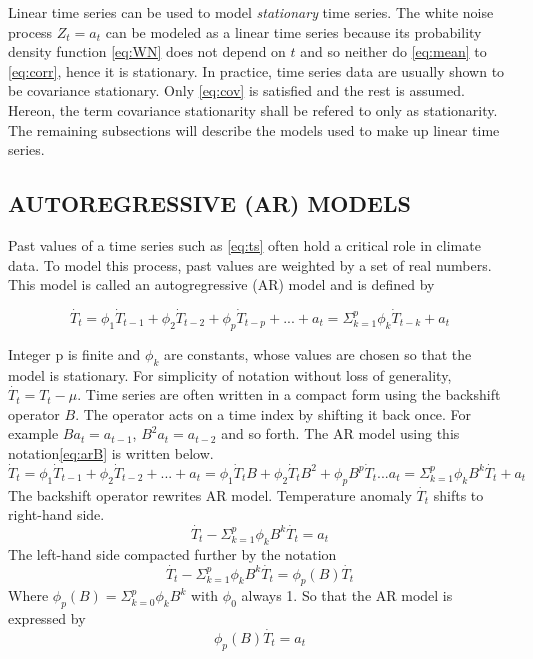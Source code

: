 Linear time series can be used to model \textit{stationary} time series. The white noise process $Z_t = a_t$ can be modeled as a linear time series because its probability density function \ref{eq:WN} does not depend on $t$ and so neither do \ref{eq:mean} to \ref{eq:corr}, hence it is stationary. In practice, time series data are usually shown to be covariance stationary. Only \ref{eq:cov} is satisfied and the rest is assumed. Hereon, the term covariance stationarity shall be refered to only as stationarity.
The remaining subsections will describe the models used to make up linear time series.

\subsection{AUTOREGRESSIVE (AR) MODELS}

Past values of a time series such as \ref{eq:ts} often hold a critical role in climate data. To model this process, past values are weighted by a set of real numbers. This model is called an autogregressive (AR) model and is defined by

\begin{equation}\label{eq:ar}
\dot{T_t} = \phi_1 \dot{T}_{t-1} + \phi_2 \dot{T}_{t-2} + \phi_p \dot{T}_{t-p} + ... + a_t = \Sigma_{k=1}^p \phi_k \dot{T}_{t-k} + a_t
\end{equation}

Integer p is finite and $\phi_k$ are constants, whose values are chosen so that the model is stationary. For simplicity of notation without loss of generality, $\dot{T_t}=T_t - \mu$. Time series are often written in a compact form using the backshift operator $B$. The operator acts on a time index by shifting it back once. For example $Ba_t = a_{t-1}$, $B^2a_t = a_{t-2}$ and so forth. The AR model using this notation\ref{eq:arB} is written below.
\begin{equation}\label{eq:arB}
\dot{T}_{t} = \phi_1 \dot{T}_{t-1} + \phi_2 \dot{T}_{t-2} + ... + a_t = \phi_1 \dot{T}_{t} B + \phi_2 \dot{T}_{t} B^2 + \phi_p B^p \dot{T}_{t}... a_t = \Sigma_{k=1}^p \phi_k B^k \dot{T_{t}} + a_t
\end{equation}
The backshift operator rewrites AR model. Temperature anomaly $\dot{T_{t}}$ shifts to right-hand side. 
\begin{equation}
 \dot{T_{t}} - \Sigma_{k=1}^p \phi_k B^k  \dot{T_{t}} = a_t
\end{equation}
The left-hand side compacted further by the notation
\begin{equation}
 \dot{T_{t}} - \Sigma_{k=1}^p \phi_k B^k  \dot{T_{t}} = \phi_p(B) \dot{T_{t}}
\end{equation}
Where $\phi_p(B) = \Sigma_{k=0}^p \phi_k B^k$ with $\phi_0$ always 1. So that the AR model is expressed by
\begin{equation}\label{eq:arc}
\phi_p(B) \dot{T_{t}} = a_t
\end{equation}

